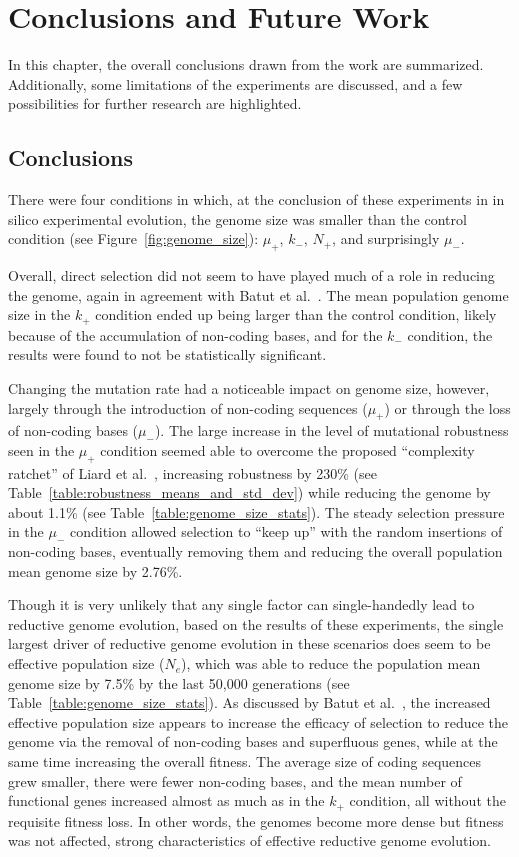 
\chapter{Conclusions and Future Work}\label{ch:05conclusion}

In this chapter, the overall conclusions drawn from the work are summarized. Additionally, some limitations of the experiments are discussed, and a few possibilities for further research are highlighted.

\section{Conclusions}
There were four conditions in which, at the conclusion of these experiments in in silico experimental evolution, the genome size was smaller than the control condition (see Figure~\ref{fig:genome_size}): $\mu_+$, $k_-$, $N_+$, and surprisingly $\mu_-$. 

Overall, direct selection did not seem to have played much of a role in reducing the genome, again in agreement with Batut et al.~\cite{Batut.2014}. The mean population genome size in the $k_+$ condition ended up being larger than the control condition, likely because of the accumulation of non-coding bases, and for the $k_-$ condition, the results were found to not be statistically significant. 

Changing the mutation rate had a noticeable impact on genome size, however, largely through the introduction of non-coding sequences ($\mu_+$) or through the loss of non-coding bases ($\mu_-$). The large increase in the level of mutational robustness seen in the $\mu_+$ condition seemed able to overcome the proposed ``complexity ratchet'' of Liard et al.~\cite{Liard.2018}, increasing robustness by 230\% (see Table~\ref{table:robustness_means_and_std_dev}) while reducing the genome by about 1.1\% (see Table~\ref{table:genome_size_stats}). The steady selection pressure in the $\mu_-$ condition allowed selection to ``keep up'' with the random insertions of non-coding bases, eventually removing them and reducing the overall population mean genome size by 2.76\%. 

Though it is very unlikely that any single factor can single-handedly lead to reductive genome evolution, based on the results of these experiments, the single largest driver of reductive genome evolution in these scenarios does seem to be effective population size ($N_e$), which was able to reduce the population mean genome size by 7.5\% by the last 50,000 generations (see Table~\ref{table:genome_size_stats}). As discussed by Batut et al.~\cite{Batut.2014}, the increased effective population size appears to increase the efficacy of selection to reduce the genome via the removal of non-coding bases and superfluous genes, while at the same time increasing the overall fitness. The average size of coding sequences grew smaller, there were fewer non-coding bases, and the mean number of functional genes increased almost as much as in the $k_+$ condition, all without the requisite fitness loss. In other words, the genomes become more dense but fitness was not affected, strong characteristics of effective reductive genome evolution. 

